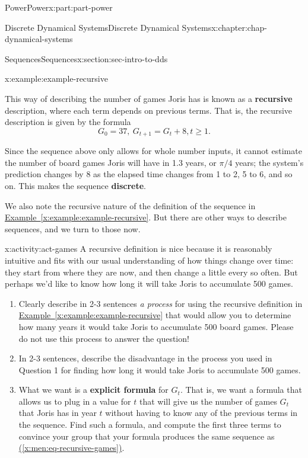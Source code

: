 \documentclass[oneside,10pt,]{book}
\newcommand{\xreffont}{\relax}
\newcommand{\terminology}[1]{\textbf{#1}}
\numberwithin{equation}{section}
\renewcommand{\ge}{\geqslant}
\begin{document}
\begin{partptx}{Power}{}{Power}{}{}{x:part:part-power}
\begin{chapterptx}{Discrete Dynamical Systems}{}{Discrete Dynamical Systems}{}{}{x:chapter:chap-dynamical-systems}
\begin{sectionptx}{Sequences}{}{Sequences}{}{}{x:section:sec-intro-to-dds}
\begin{example}{}{x:example:example-recursive}
\par
This way of describing the number of games Joris has is known as a \terminology{recursive} description, where each term depends on previous terms. That is, the recursive description is given by the formula%
\begin{equation}
G_0 = 37, \ G_{t+1} = G_t + 8, t \ge 1.\label{x:men:eq-recursive-games}
\end{equation}
%
\end{example}
Since the sequence above only allows for whole number inputs, it cannot estimate the number of board games Joris will have in 1.3 years, or \(\pi/4\) years; the system's prediction changes by 8 as the elapsed time changes from 1 to 2, 5 to 6, and so on. This makes the sequence \terminology{discrete}.%
\par
We also note the recursive nature of the definition of the sequence in \hyperref[x:example:example-recursive]{Example~{\xreffont\ref{x:example:example-recursive}}}. But there are other ways to describe sequences, and we turn to those now.%
\begin{activity}{}{x:activity:act-games}%
A recursive definition is nice because it is reasonably intuitive and fits with our usual understanding of how things change over time: they start from where they are now, and then change a little every so often. But perhaps we'd like to know how long it will take Joris to accumulate 500 games. %
%
\begin{enumerate}
\item{}Clearly describe in 2-3 sentences \emph{a process} for using the recursive definition in \hyperref[x:example:example-recursive]{Example~{\xreffont\ref{x:example:example-recursive}}} that would allow you to determine how many years it would take Joris to accumulate 500 board games. Please do not use this process to answer the question!%
\item{}In 2-3 sentences, describe the disadvantage in the process you used in Question 1 for finding how long it would take Joris to accumulate 500 games.%
\item{}What we want is a \terminology{explicit formula} for \(G_t\). That is, we want a formula that allows us to plug in a value for \(t\) that will give us the number of games \(G_t\) that Joris has in year \(t\) without having to know any of the previous terms in the sequence. Find such a formula, and compute the first three terms to convince your group that your formula produces the same sequence as \hyperref[x:men:eq-recursive-games]{({\xreffont\ref{x:men:eq-recursive-games}})}.%

\end{enumerate}
\end{activity}
\end{sectionptx}
\end{chapterptx}
\end{partptx}
\end{document}
